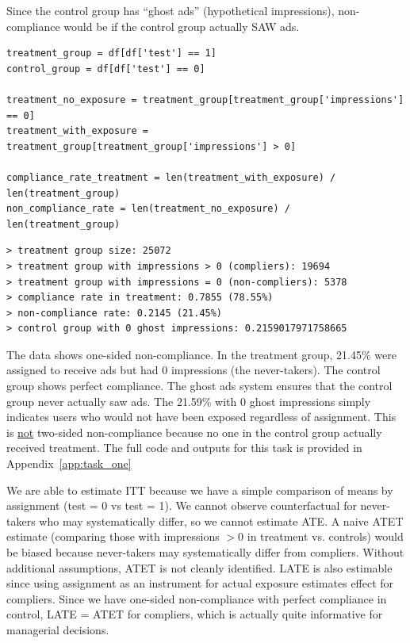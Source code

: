 \documentclass[10pt]{article}
\begin{document}
    Since the control group has ``ghost ads'' (hypothetical impressions), non-compliance would be if the control group actually SAW ads. 

\begin{lstlisting}
treatment_group = df[df['test'] == 1]
control_group = df[df['test'] == 0]

treatment_no_exposure = treatment_group[treatment_group['impressions'] == 0]
treatment_with_exposure = treatment_group[treatment_group['impressions'] > 0]

compliance_rate_treatment = len(treatment_with_exposure) / len(treatment_group)
non_compliance_rate = len(treatment_no_exposure) / len(treatment_group)
\end{lstlisting}
\begin{verbatim}
> treatment group size: 25072
> treatment group with impressions > 0 (compliers): 19694
> treatment group with impressions = 0 (non-compliers): 5378
> compliance rate in treatment: 0.7855 (78.55%)
> non-compliance rate: 0.2145 (21.45%)
> control group with 0 ghost impressions: 0.2159017971758665

\end{verbatim}

    The data shows one-sided non-compliance. In the treatment group, 21.45\% were assigned to receive ads but had 0 impressions (the never-takers). The control group shows perfect compliance. The ghost ads system ensures that the control group never actually saw ads. The 21.59\% with 0 ghost impressions simply indicates users who would not have been exposed regardless of assignment. This is \underline{not} two-sided non-compliance because no one in the control group actually received treatment. The full code and outputs for this task is provided in Appendix~\ref{app:task_one}

    We are able to estimate ITT because we have a simple comparison of means by assignment (test = 0 vs test = 1). We cannot observe counterfactual for never-takers who may systematically differ, so we cannot estimate ATE. A naive ATET estimate (comparing those with impressions $> 0 $ in treatment vs. controls) would be biased because never-takers may systematically differ from compliers. Without additional assumptions, ATET is not cleanly identified. LATE is also estimable since using assignment as an instrument for actual exposure estimates effect for compliers. Since we have one-sided non-compliance with perfect compliance in control, LATE = ATET for compliers, which is actually quite informative for managerial decisions. 
\newpage
\end{document}
